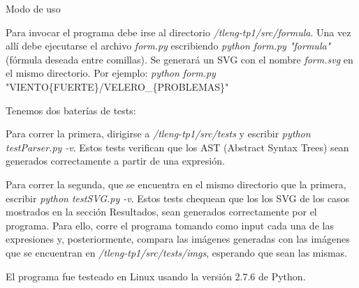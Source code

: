 
\begin{section}{Modo de uso}

Para invocar el programa debe irse al directorio \textit{/tleng-tp1/src/formula}. Una vez allí debe ejecutarse el archivo \textit{form.py} escribiendo
\textit{python form.py "formula"} (fórmula deseada entre comillas). Se generará un SVG con el nombre \textit{form.svg} en el mismo directorio.
Por ejemplo: \textit{python form.py} "VIENTO\{FUERTE\}/VELERO\_\{PROBLEMAS\}"

Tenemos dos baterías de tests:

Para correr la primera, dirigirse a \textit{/tleng-tp1/src/tests} y escribir \textit{python testParser.py -v}. Estos tests verifican que los AST (Abstract Syntax Trees) sean generados correctamente a partir de una expresión.

Para correr la segunda, que se encuentra en el mismo directorio que la primera, escribir \textit{python testSVG.py -v}. Estos tests chequean que los los SVG de los casos mostrados en la sección Resultados, sean generados correctamente por el programa. Para ello, corre el programa tomando como input cada una de las expresiones y, posteriormente, compara las imágenes generadas con las imágenes que se encuentran en \textit{/tleng-tp1/src/tests/imgs}, esperando que sean las mismas.

El programa fue testeado en Linux usando la versión 2.7.6 de Python.

\end{section}